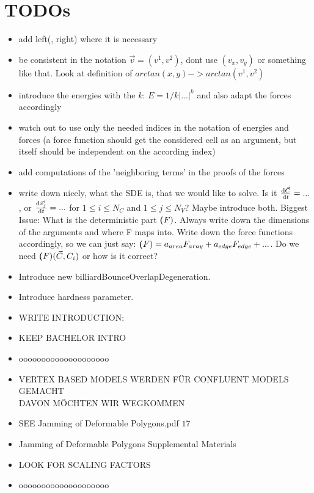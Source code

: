 \section{TODOs}

\begin{itemize}
    \item add left(, right) where it is necessary 
    \item be consistent in the notation $\vec{v} = (v^1, v^2)$, dont use $(v_x, v_y)$ or something like that. Look at definition of $arctan(x,y) -> arctan(v^1,v^2)$
    \item introduce the energies with the $k$: $E = 1/k |...|^k$ and also adapt the forces accordingly 
    \item watch out to use only the needed indices in the notation of energies and forces (a force function should get the considered cell as an argument, but itself should be independent on the according index)
    \item add computations of the 'neighboring terms' in the proofs of the forces  
    \item write down nicely, what the SDE is, that we would like to solve. Is it $\frac{\mathrm{d} \vec{C}}{\mathrm{d} t} = ... $, or $\frac{\mathrm{d} \vec{v}_j^i}{\mathrm{d} t} = ... $ for $ 1 \leq i \leq N_C$ and $1 \leq j \leq N_V$? Maybe introduce both. Biggest Issue: What is the deterministic part $\textbf(F)$. Always write down the dimensions of the arguments and where F maps into. Write down the force functions accordingly, so we can just say: $\textbf(F) = a_{area} F_{aray} + a_{edge} F_{edge} + ...$. Do we need $\textbf(F)(\vec{C}, C_i)$ or how is it correct?
    \item Introduce new billiardBounceOverlapDegeneration.
    \item Introduce hardness parameter. 
    \item WRITE INTRODUCTION:
    \item KEEP BACHELOR INTRO 
    \item oooooooooooooooooooo
    \item VERTEX BASED MODELS WERDEN FÜR CONFLUENT MODELS GEMACHT \\ DAVON MÖCHTEN WIR WEGKOMMEN 
    \item SEE Jamming of Deformable Polygons.pdf $17$ 
    \item Jamming of Deformable Polygons Supplemental Materials
    \item LOOK FOR SCALING FACTORS
    \item oooooooooooooooooooo

\end{itemize}
